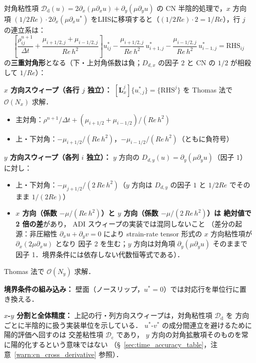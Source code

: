 \begin{tcolorbox}[resultbox, title={CN 対角粘性系の行列構造}]
\label{box:cn_tridiagonal}
対角粘性項 $\mathcal{D}_{\mathrm{d}}(u) = 2\partial_x(\mu\partial_x u) + \partial_y(\mu\partial_y u)$
の CN 半陰的処理で，$x$ 方向項 $(1/2Re)\cdot 2\partial_x(\mu\partial_x u^*)$
をLHSに移項すると（$(1/2Re)\cdot 2 = 1/Re$），行 $j$ の連立系は：
\[
  \left[\frac{\rho^{n+1}_{ij}}{\Delta t}
    + \frac{\mu_{i+1/2,j}+\mu_{i-1/2,j}}{Re\,h^2}\right]u^*_{ij}
  - \frac{\mu_{i+1/2,j}}{Re\,h^2}\,u^*_{i+1,j}
  - \frac{\mu_{i-1/2,j}}{Re\,h^2}\,u^*_{i-1,j}
  = \mathrm{RHS}_{ij}
\]
の\textbf{三重対角形}となる（下・上対角係数は負；$D_{d,x}$ の因子 $2$ と CN の $1/2$ が相殺して $1/Re$）：

\medskip
\textbf{$x$ 方向スウィープ（各行 $j$ 独立）：}
$[\mathbf{L}_x^j]\{u^*_{\cdot,j}\} = \{\mathrm{RHS}^j\}$ を Thomas 法で $\mathcal{O}(N_x)$ 求解．
\begin{itemize}
  \item 主対角：$\rho^{n+1}/\Delta t + (\mu_{i+1/2}+\mu_{i-1/2})/(Re\,h^2)$
  \item 上・下対角：$-\mu_{i+1/2}/(Re\,h^2)$，$-\mu_{i-1/2}/(Re\,h^2)$（ともに負符号）
\end{itemize}

\textbf{$y$ 方向スウィープ（各列 $i$ 独立）：}
$y$ 方向の $D_{d,y}(u) = \partial_y(\mu\partial_y u)$（因子 $1$）に対し：
\begin{itemize}
  \item 上・下対角：$-\mu_{j+1/2}/(2\,Re\,h^2)$（$y$ 方向は $D_{d,y}$ の因子 $1$ と $1/2Re$ でそのまま $1/(2Re)$）
  \item \textbf{$x$ 方向（係数 $-\mu/(Re\,h^2)$）と $y$ 方向（係数 $-\mu/(2\,Re\,h^2)$）は
        絶対値で 2 倍の差}があり，
        ADI スウィープの実装では混同しないこと
        （差分の起源：非圧縮性 $\partial_x u + \partial_y v = 0$ により
        strain-rate tensor 形式の $x$ 方向粘性項が $\partial_x(2\mu\partial_x u)$ となり
        因子 2 を生む；$y$ 方向は対角項 $\partial_y(\mu\partial_y u)$ そのままで
        因子 1．境界条件には依存しない代数恒等式である）．
\end{itemize}
Thomas 法で $\mathcal{O}(N_y)$ 求解．

\textbf{境界条件の組み込み：}
壁面（ノースリップ，$u^*=0$）では対応行を単位行に置き換える．

\textbf{$x$-$y$ 分割と全体精度：}
上記の行・列方向スウィープは，対角粘性項 $\mathcal{D}_{\mathrm{d}}$ を
方向ごとに半陰的に扱う実装単位を示している．
$u^*$-$v^*$ の成分間連立を避けるために陽的評価へ回すのは
交差粘性項 $\mathcal{D}_{\mathrm{c}}$ であり，
$y$ 方向の対角拡散項そのものを常に陽的化するという意味ではない
（§~\ref{sec:time_accuracy_table}，注意~\ref{warn:cn_cross_derivative} 参照）．
\end{tcolorbox}

